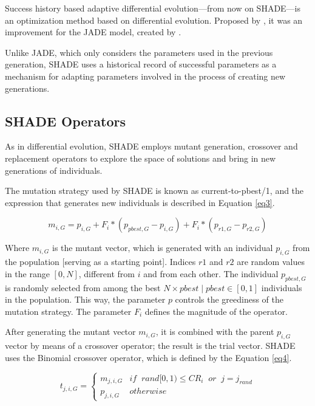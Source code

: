 \documentclass[review]{elsarticle}
\begin{document}
Success history based adaptive differential evolution---from now on SHADE---is an optimization method based on differential evolution. Proposed by \cite{tanabe2013success}, it was an improvement for the JADE model, created by \cite{zhang2009jade}.

Unlike JADE, which only considers the parameters used in the previous generation, SHADE uses a historical record of successful parameters as a mechanism for adapting parameters involved in the process of creating new generations.

\subsection{SHADE Operators}

As in differential evolution, SHADE employs mutant generation, crossover and replacement operators to explore the space of solutions and bring in new generations of individuals.

The mutation strategy used by SHADE is known as current-to-pbest/1, and the expression that generates new individuals is described in Equation \eqref{eq3}.

\begin{equation}
m_{i,G} = p_{i,G} + F_i * (p_{pbest, G} - p_{i,G}) + F_i * (p_{r1, G} - p_{r2,G})
\label{eq3}
\end{equation}

Where $m_{i,G}$ is the mutant vector, which is generated with an individual $p_{i,G}$ from the population [serving as a starting point]. Indices $r1$ and $r2$ are random values in the range $[0,N]$, different from $i$ and from each other. The individual $p_{pbest, G}$ is randomly selected from among the best $N \times pbest\;|\;pbest\in [0,1]$ individuals in the population. This way, the parameter $p$ controls the greediness of the mutation strategy. The parameter $F_i$ defines the magnitude of the operator.

After generating the mutant vector $m_{i,G}$, it is combined with the parent $p_{i,G}$ vector by means of a crossover operator; the result is the trial vector. SHADE uses the Binomial crossover operator, which is defined by the Equation \eqref{eq4}.

\begin{equation}
t_{j,i,G} = \left\{ \begin{array}{lc}
m_{j,i,G} &   if \;\; rand[0,1) \le CR_i \;\; or \;\;j = j_{rand} \\
p_{j,i,G} &  otherwise
\end{array}
\right.
\label{eq4}
\end{equation}
\end{document}
